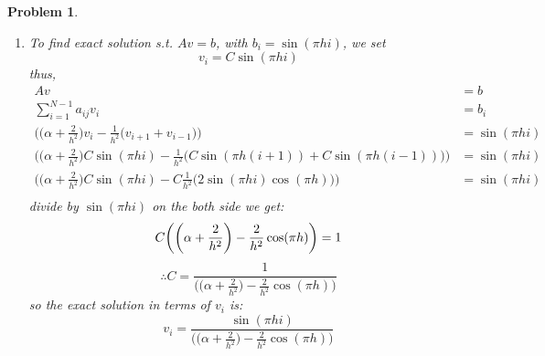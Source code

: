 \documentclass[a4paper,12pt]{article}
\newtheorem{prob}{Problem}[]
\begin{document}
\begin{prob}
\begin{enumerate}[label=(\alph*)]
		\item To find exact solution s.t. $Av = b$, with $b_i = \sin(\pi h i)$, we set $$v_i = C \sin (\pi h i)$$ thus,
		\begin{equation*}
		\begin{aligned}
		A v &= b\\
		\sum_{i=1}^{N-1}a_{ij} v_i &= b_i\\
		\bigg( \bigg(\alpha + \frac{2}{h^2}\bigg)v_i - \frac{1}{h^2} \big( v_{i+1} + v_{i-1}\big) \bigg) &= \sin(\pi h i)\\
		\bigg( \bigg(\alpha + \frac{2}{h^2}\bigg)C \sin (\pi h i) - \frac{1}{h^2} \big( C \sin (\pi h (i+1)) + C \sin (\pi h (i-1))\big) \bigg) &= \sin(\pi h i)\\
		\bigg( \bigg(\alpha + \frac{2}{h^2}\bigg)C \sin (\pi h i) - C \frac{1}{h^2} \big( 2\sin (\pi h i) \cos (\pi h)\big) \bigg) &= \sin(\pi h i)\\
		\end{aligned}
		\end{equation*}
		divide by $\sin (\pi h i)$ on the both side we get:
		\begin{equation*}
		C \bigg( \bigg(\alpha + \frac{2}{h^2}\bigg) - \frac{2}{h^2} \cos (\pi h) \bigg) = 1\\
		\end{equation*}
		$$\therefore C = \frac{1}{\bigg( \bigg(\alpha + \frac{2}{h^2}\bigg) - \frac{2}{h^2} \cos (\pi h) \bigg)}$$
		so the exact solution in terms of $v_i$ is: $$v_i = \frac{\sin (\pi h i)}{\bigg( \bigg(\alpha + \frac{2}{h^2}\bigg) - \frac{2}{h^2} \cos (\pi h) \bigg)}$$
		

\end{enumerate}
\end{prob}
\end{document}
